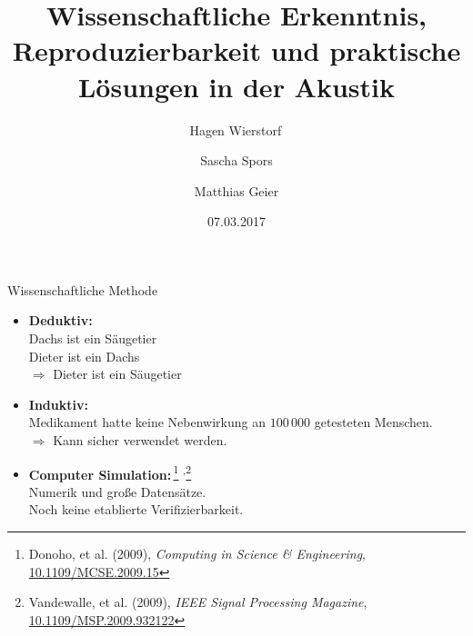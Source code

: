 \documentclass{beamer}
\begin{document}
\title{Wissenschaftliche Erkenntnis, Reproduzierbarkeit und praktische Lösungen
in der Akustik}
\author{Hagen Wierstorf$\,$ \and
        Sascha Spors \and
        Matthias Geier}
\date{07.03.2017}
\maketitle

\begin{frame}{Wissenschaftliche Methode}

    \begin{itemize}
        \item \textbf{Deduktiv:} \\
            \small{Dachs ist ein Säugetier\\%
                   Dieter ist ein Dachs\\%
                   $\Rightarrow$ Dieter ist ein Säugetier}
    \end{itemize}
    \begin{itemize}
        \item \textbf{Induktiv:} \\
            \small{Medikament hatte keine Nebenwirkung an $100\,000$ getesteten
                   Menschen.\\%
                   $\Rightarrow$ Kann sicher verwendet werden.}
    \end{itemize}
    \begin{itemize}
        \item \textbf{Computer Simulation:}\,\footnote{%
            Donoho, et al. (2009), \emph{Computing in Science \& Engineering},
            \href{https://doi.org/10.1109/MCSE.2009.15}{10.1109/MCSE.2009.15}}%
            \textsuperscript{,}\footnote{%
            Vandewalle, et al. (2009), \emph{IEEE Signal Processing Magazine},
            \href{https://doi.org/10.1109/MSP.2009.932122}{10.1109/MSP.2009.932122}}
            \\
            \small{Numerik und große Datensätze.\\
            Noch keine etablierte Verifizierbarkeit.}
    \end{itemize}

\end{frame}
\end{document}
